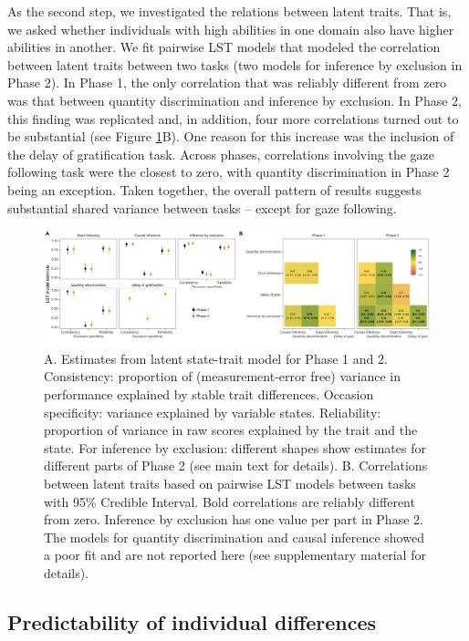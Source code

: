 \documentclass[
  man,floatsintext]{apa6}
\begin{document}
As the second step, we investigated the relations between latent traits. That is, we asked whether individuals with high abilities in one domain also have higher abilities in another. We fit pairwise LST models that modeled the correlation between latent traits between two tasks (two models for inference by exclusion in Phase 2). In Phase 1, the only correlation that was reliably different from zero was that between quantity discrimination and inference by exclusion. In Phase 2, this finding was replicated and, in addition, four more correlations turned out to be substantial (see Figure \ref{fig:lstmplot}B). One reason for this increase was the inclusion of the delay of gratification task. Across phases, correlations involving the gaze following task were the closest to zero, with quantity discrimination in Phase 2 being an exception. Taken together, the overall pattern of results suggests substantial shared variance between tasks -- except for gaze following.

\begin{figure}
\includegraphics[width=1\linewidth]{./figures/lstm} \caption{A. Estimates from latent state-trait model for Phase 1 and 2. Consistency: proportion of (measurement-error free) variance in performance explained by stable trait differences. Occasion specificity: variance explained by variable states. Reliability: proportion of variance in raw scores explained by the trait and the state. For inference by exclusion: different shapes show estimates for different parts of Phase 2 (see main text for details). B. Correlations between latent traits based on pairwise LST models between tasks with 95\% Credible Interval. Bold correlations are reliably different from zero. Inference by exclusion has one value per part in Phase 2. The models for quantity discrimination and causal inference showed a poor fit and are not reported here (see supplementary material for details).}\label{fig:lstmplot}
\end{figure}

\hypertarget{predictability-of-individual-differences}{%
\subsection{Predictability of individual differences}\label{predictability-of-individual-differences}}
\end{document}
